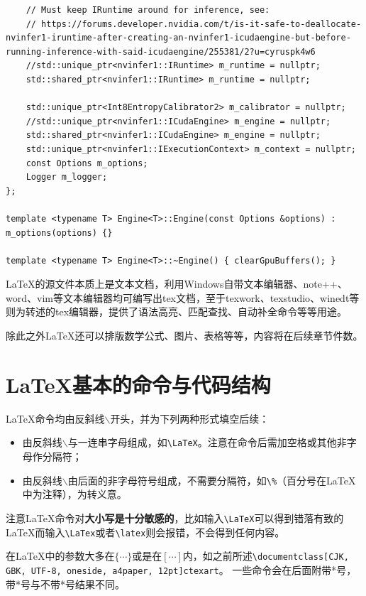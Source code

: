 \begin{lstlisting}
    // Must keep IRuntime around for inference, see:
    // https://forums.developer.nvidia.com/t/is-it-safe-to-deallocate-nvinfer1-iruntime-after-creating-an-nvinfer1-icudaengine-but-before-running-inference-with-said-icudaengine/255381/2?u=cyruspk4w6
    //std::unique_ptr<nvinfer1::IRuntime> m_runtime = nullptr;
    std::shared_ptr<nvinfer1::IRuntime> m_runtime = nullptr;

    std::unique_ptr<Int8EntropyCalibrator2> m_calibrator = nullptr;
    //std::unique_ptr<nvinfer1::ICudaEngine> m_engine = nullptr;
    std::shared_ptr<nvinfer1::ICudaEngine> m_engine = nullptr;
    std::unique_ptr<nvinfer1::IExecutionContext> m_context = nullptr;
    const Options m_options;
    Logger m_logger;
};

template <typename T> Engine<T>::Engine(const Options &options) : m_options(options) {}

template <typename T> Engine<T>::~Engine() { clearGpuBuffers(); }

\end{lstlisting}




\LaTeX 的源文件本质上是文本文档，利用Windows自带文本编辑器、note++、word、vim等文本编辑器均可编写出tex文档，至于texwork、texstudio、winedt等则为转述的tex编辑器，提供了语法高亮、匹配查找、自动补全命令等等用途。

除此之外\LaTeX 还可以排版数学公式、图片、表格等等，内容将在后续章节件数。
\section{\LaTeX 基本的命令与代码结构}
\LaTeX 命令均由反斜线$\backslash$开头，并为下列两种形式填空后续：
\begin{itemize}
\item 由反斜线$\backslash$与一连串字母组成，如\verb|\LaTeX|。注意在命令后需加空格或其他非字母作分隔符；
\item 由反斜线$\backslash$由后面的非字母符号组成，不需要分隔符，如\verb|\%|（百分号在\LaTeX 中为注释），为转义意。
\end{itemize}

注意\LaTeX 命令对\textbf{大小写是十分敏感的}，比如输入\verb|\LaTeX|可以得到错落有致的\LaTeX 而输入\verb|\LaTex|或者\verb|\latex|则会报错，不会得到任何内容。

在\LaTeX 中的参数大多在$\{\cdots\}$或是在$[\cdots]$内，如之前所述\verb|\documentclass|\texttt{[CJK, GBK, UTF-8, oneside, a4paper, 12pt]{ctexart}}。
一些命令会在后面附带*号，带*号与不带*号结果不同。

